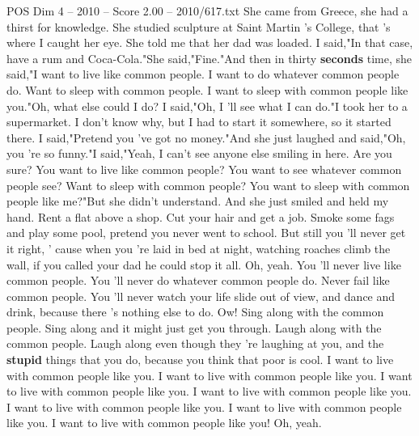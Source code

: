 \begin{textsample}{POS Dim 4 – 2010 – Score 2.00 – 2010/617.txt}  \label{ex:f4_pos_038}
She came from Greece, she had a thirst for knowledge.
She studied sculpture at Saint Martin 's College, that 's where I caught her eye.
She told me that her dad was loaded.
I said,"In that case, have a rum and Coca-Cola."She said,"Fine."And then in thirty \textbf{seconds} time, she said,"I want to live like common people.
I want to do whatever common people do.
Want to sleep with common people.
I want to sleep with common people like you."Oh, what else could I do?
I said,"Oh, I 'll see what I can do."I took her to a supermarket.
I don't know why, but I had to start it somewhere, so it started there.
I said,"Pretend you 've got no money."And she just laughed and said,"Oh, you 're so funny."I said,"Yeah, I can't see anyone else smiling in here.
Are you sure?
You want to live like common people?
You want to see whatever common people see?
Want to sleep with common people?
You want to sleep with common people like me?"But she didn't understand.
And she just smiled and held my hand.
Rent a flat above a shop.
Cut your hair and get a job.
Smoke some fags and play some pool, pretend you never went to school.
But still you 'll never get it right, ' cause when you 're laid in bed at night, watching roaches climb the wall, if you called your dad he could stop it all.
Oh, yeah.
You 'll never live like common people.
You 'll never do whatever common people do.
Never fail like common people.
You 'll never watch your life slide out of view, and dance and drink, because there 's nothing else to do.
Ow!
Sing along with the common people.
Sing along and it might just get you through.
Laugh along with the common people.
Laugh along even though they 're laughing at you, and the \textbf{stupid} things that you do, because you think that poor is cool.
I want to live with common people like you.
I want to live with common people like you.
I want to live with common people like you.
I want to live with common people like you.
I want to live with common people like you.
I want to live with common people like you.
I want to live with common people like you!
Oh, yeah.

\end{textsample}
